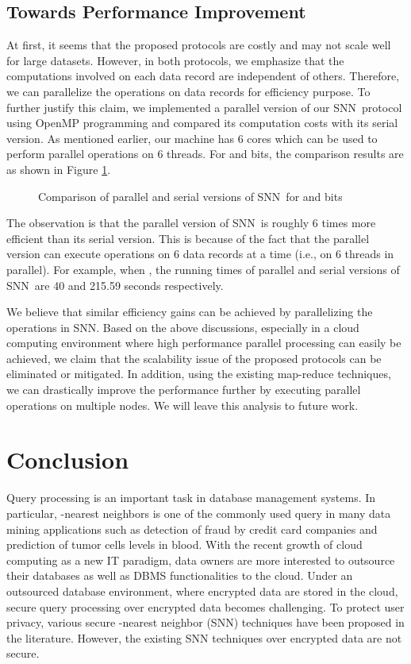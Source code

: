 \documentclass{article}
\newcommand{\sknnb}{SNN}
\newcommand{\sknnm}{SNN}
\begin{document}
\subsection{Towards Performance Improvement}
At first, it seems that the proposed protocols are costly and may 
not scale well for large datasets. However, in both protocols, we emphasize 
that the computations involved on each data record are 
independent of others. Therefore, we can parallelize the operations on data records for 
efficiency purpose. To 
further justify this claim, we implemented a 
parallel version of our \sknnb~protocol using OpenMP programming and compared its 
computation costs with its serial version. As mentioned earlier, our machine has 6 cores which can be used to 
perform parallel operations on 6 threads. For  and  bits, the comparison 
results are as shown in Figure \ref{fig:comp-with-parallel}. 
\begin{figure}
\centering
{}
\caption{Comparison of parallel and serial versions of \sknnb~for  and  bits}
\label{fig:comp-with-parallel}
\end{figure}
The observation is 
that the parallel version of \sknnb~is roughly 6 times more efficient than its serial version. This 
is because of the fact that the parallel version can execute operations on 6 data records at a time (i.e., 
on 6 threads in parallel). For example, when , the running times of 
parallel and serial versions of \sknnb~are 40 and 215.59 seconds respectively. 
 


We believe that similar efficiency gains can be achieved by parallelizing the operations in \sknnm. 
Based on the above discussions, especially in a cloud 
computing environment where high performance parallel processing can easily be 
achieved, we claim that the scalability issue of the proposed protocols can be eliminated or mitigated.
In addition, using the existing map-reduce techniques, we can drastically 
improve the performance further by executing parallel operations 
on multiple nodes. We will leave this analysis to future work. 

\section{Conclusion} \label{sec:concl}
Query processing is an important task in database management systems. In particular, 
-nearest neighbors is one of the commonly used query in many data mining applications 
such as detection of fraud by credit card companies and prediction of tumor cells levels 
in blood. With the recent growth of cloud computing as a new IT paradigm, data owners are more 
interested to outsource their databases as well as DBMS functionalities to the cloud. Under an outsourced 
database environment, where encrypted data are stored in the cloud, secure query processing over 
encrypted data becomes challenging. To protect user privacy, various secure  
-nearest neighbor (SNN) techniques have been proposed in the literature. However, the existing 
SNN techniques over encrypted data are not secure. 
\end{document}
